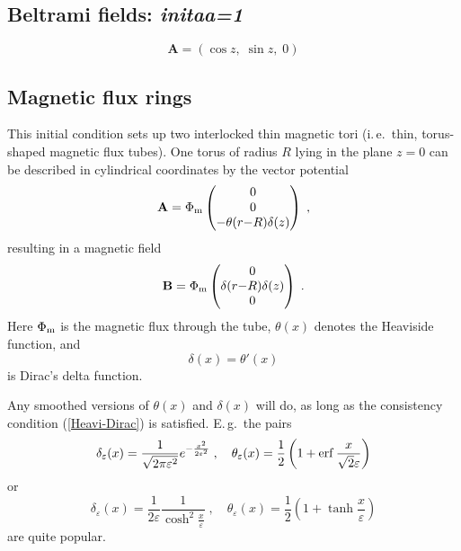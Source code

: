 \documentclass[12pt,twoside,notitlepage,a4paper]{article}
\makeatletter
\newcommand{\var}[1]{\textsl{#1}\index{#1@\emph{#1}}\/}
\newcommand{\erf}     {\mathop{\rm erf}\nolimits}
\newcommand{\vekt}[1] {\mathbf{#1}}
\newcommand{\Av}            {\vekt{A}}
\newcommand{\Bv}            {\vekt{B}}
\newcommand{\Heavi}         {\theta}
\makeatother
\begin{document}
\subsection{Beltrami fields: \var{initaa=1}}

\begin{equation}
\Av=(\cos z,\;\sin z,\;0)
\label{Beltrami}
\end{equation}

\subsection{Magnetic flux rings}

This initial condition sets up two interlocked thin magnetic tori
(i.\,e.~thin, torus-shaped magnetic flux tubes).
One torus of radius $R$ lying in the plane $z=0$ can be described in
cylindrical coordinates by the
vector potential
\begin{equation} \label{Av-flux-ring-cyl}
  \Av = 
  \Phi_{\rm m}
  \begin{pmatrix}
    0\\ 0\\ -\Heavi(r{-}R) \delta(z)
  \end{pmatrix} \; ,
\end{equation}
resulting in a magnetic field
\begin{equation}
  \Bv = 
  \Phi_{\rm m}
  \begin{pmatrix}
    0\\ \delta(r{-}R) \delta(z)\\ 0
  \end{pmatrix} \; .
\end{equation}
Here $\Phi_{\rm m}$ is the magnetic flux through the tube,
$\Heavi(x)$ denotes the Heaviside function, and
\begin{equation} \label{Heavi-Dirac}
 \delta(x) = \Heavi'(x)
\end{equation}
is Dirac's delta function.

Any smoothed versions of $\Heavi(x)$ and $\delta(x)$ will do, as long as
the consistency condition (\ref{Heavi-Dirac}) is satisfied.
E.\,g.~the pairs
\begin{equation}
  \delta_\varepsilon(x)
  = \frac{1}{\sqrt{2\pi\varepsilon^2}} e^{-\frac{x^2}{2\varepsilon^2}} \; ,
  \quad
  \Heavi_\varepsilon(x)
  = \frac{1}{2} \left( 1 + \erf\frac{x}{\sqrt{2}\varepsilon} \right)
\end{equation}
or
\begin{equation}
  \delta_\varepsilon(x)
  = \frac{1}{2\varepsilon}\frac{1}{\cosh^2\frac{x}{\varepsilon}} \; ,
  \quad
  \Heavi_\varepsilon(x)
  = \frac{1}{2} \left( 1 + \tanh\frac{x}{\varepsilon} \right)
\end{equation}
are quite popular.
\end{document}
